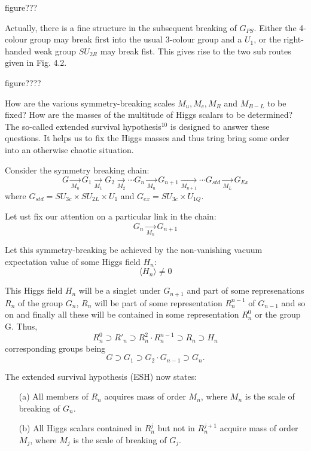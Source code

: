 figure???

Actually, there is a fine structure in the subsequent breaking of $G_{PS}$. Either the 4-colour group may break first into the usual 3-colour group and a $U_{1}$, or the right-handed weak group $SU_{2R}$ may break fist. This gives rise to the two sub routes given in Fig. 4.2.

figure????

How are the various symmetry-breaking scales $M_{u}, M_{c}, M_{R}$ and $M_{B-L}$ to be fixed? How are the masses of the multitude of Higgs scalars to be determined? The so-called extended survival hypothesis$^{10}$ is designed to answer these questions. It helps us to fix the Higgs masses and thus tring bring some order into an otherwise chaotic situation.

Consider the symmetry breaking chain:
$$
G \xrightarrow[M_{u}]{} G_{1} \xrightarrow[M_{1}]{} G_{2} \xrightarrow[M_{2}]{} \cdots G_{n} \xrightarrow[M_{n}]{} G_{n+1} \xrightarrow[M_{n+1}]{} \cdots G_{std} \xrightarrow[M_{L}]{} G_{Ex}
$$
where $G_{std}= SU_{3c} \times SU_{2L} \times U_{1}$ and $G_{ex}= SU_{3c} \times U_{1 Q}$.

Let ust fix our attention on a particular link in the chain:
$$
G_{n} \xrightarrow[M_{n}]{} G_{n+1}
$$

Let this symmetry-breaking be achieved by the non-vanishing vacuum expectation value of some Higgs field $H_{n}$:
$$
\langle H_{n} \rangle \neq 0
$$

This Higgs field $H_{n}$ will be a singlet under $G_{n+1}$ and part of some represenations $R_{n}$ of the group $G_{n}$, $R_{n}$ will be part of some representation $R^{n-1}_{n}$ of $G_{n-1}$ and so on and finally all these will be contained in some representation $R^{0}_{n}$ or the group G. Thus,
$$
R^{0}_{n} \supset R'_{n} \supset R^{2}_{n} \cdot R^{n-1}_{n} \supset R_{n} \supset H_{n}
$$
corresponding groups being
$$
G \supset G_{1} \supset G_{2} \cdot G_{n-1} \supset G_{n}.
$$

The extended survival hypothesis (ESH) now states:

\begin{itemize}
\item[(a)] All members of $R_{n}$ acquires mass of order $M_{n}$, where $M_{n}$ is the scale of breaking of $G_{n}$.
\item[(b)] All Higgs scalars contained in $R^{j}_{n}$ but not in $R_{n}^{j+1}$ acquire mass of order $M_{j}$, where $M_{j}$ is the scale of breaking of $G_{j}$.
\end{itemize}

